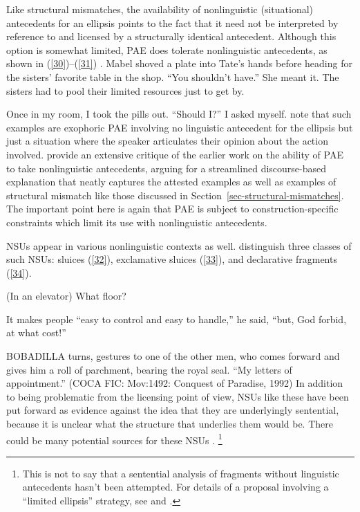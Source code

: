 Like structural mismatches, the availability of nonlinguistic (situational) antecedents for an ellipsis points to the fact that it need not be interpreted by reference to and licensed by a structurally identical antecedent. Although this option is somewhat limited, PAE does tolerate nonlinguistic antecedents, as shown in (\ref{30})--(\ref{31}) \citep[see also][]{Hankamer1976, Schachter1977}.
\ea Mabel shoved a plate into Tate's hands before heading for the sisters' favorite table in the shop. ``You shouldn't have.'' She meant it. The sisters had to pool their limited resources
just to get by. \citep[ex.\ 23]{Miller2014b}\label{30}\z

\ea Once in my room, I took the pills out. ``Should I?'' I asked myself. \citep[ex.\ 22a]{Miller2014b}\label{31}\z
%
\citet{Miller2014b} note that such examples are exophoric PAE
involving no linguistic antecedent for the ellipsis but 
just a situation where the speaker articulates their opinion about the action involved. \citet{Miller2014b} provide an extensive critique of the earlier work on the ability of PAE to take nonlinguistic antecedents, arguing for a streamlined discourse-based explanation that neatly captures the attested examples as well as examples of structural mismatch like those discussed in Section~\ref{sec-structural-mismatches}. The important point here is again that PAE is subject to construction-specific constraints which limit its use with nonlinguistic antecedents.

NSUs appear in various nonlinguistic contexts as well. \citet{Ginzburg2018} distinguish three classes of such NSUs: sluices (\ref{32}), exclamative sluices (\ref{33}), and declarative fragments (\ref{34}).

\ea (In an elevator) What floor? \citep[298]{Ginzburg:Sag:2000}\label{32}\z

\ea It makes people ``easy to control and easy to handle,'' he said, ``but, God forbid, at what cost!'' \citep[96]{Ginzburg2018}
\label{33}\z

\ea BOBADILLA turns, gestures to one of the other men, who comes forward and gives him a roll of parchment, bearing the royal seal. ``My letters of appointment.'' (COCA  FIC: Mov:1492: Conquest of Paradise, 1992)\label{34}\z
%
In addition to being problematic from the licensing point of view, NSUs like these have been put forward as evidence against the idea that they are underlyingly sentential, because it is unclear what the structure that underlies them would be. There could be many potential sources for
these NSUs 
\citep[see][306]{CJ2005a}. %
\footnote{This is not to say that a sentential analysis of fragments without linguistic antecedents hasn't been attempted. For details of a proposal involving a ``limited ellipsis'' strategy, see \citet{Merchant2005a} and \citet{Merchant2010}.}


